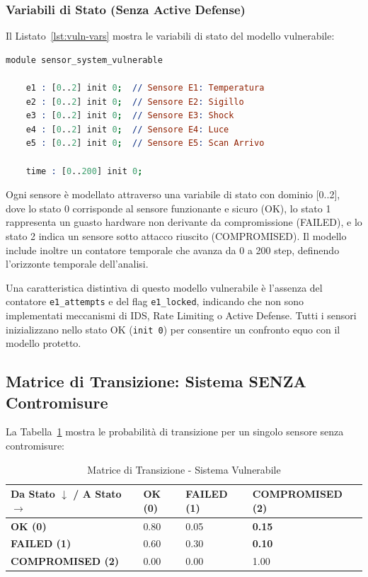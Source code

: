 \subsubsection{Variabili di Stato (Senza Active Defense)}
Il Listato~\ref{lst:vuln-vars} mostra le variabili di stato del modello vulnerabile:
\begin{lstlisting}[style=mystyle, language=Prolog, caption={Variabili di stato del modello vulnerabile}, label=lst:vuln-vars]
module sensor_system_vulnerable
    
    e1 : [0..2] init 0;  // Sensore E1: Temperatura
    e2 : [0..2] init 0;  // Sensore E2: Sigillo
    e3 : [0..2] init 0;  // Sensore E3: Shock
    e4 : [0..2] init 0;  // Sensore E4: Luce
    e5 : [0..2] init 0;  // Sensore E5: Scan Arrivo
    
    time : [0..200] init 0;
\end{lstlisting}

Ogni sensore è modellato attraverso una variabile di stato con dominio [0..2], dove lo stato 0 corrisponde al sensore funzionante e sicuro (OK), lo stato 1 rappresenta un guasto hardware non derivante da compromissione (FAILED), e lo stato 2 indica un sensore sotto attacco riuscito (COMPROMISED). Il modello include inoltre un contatore temporale che avanza da 0 a 200 step, definendo l'orizzonte temporale dell'analisi.

Una caratteristica distintiva di questo modello vulnerabile è l'assenza del contatore \texttt{e1\_attempts} e del flag \texttt{e1\_locked}, indicando che non sono implementati meccanismi di IDS, Rate Limiting o Active Defense. Tutti i sensori inizializzano nello stato OK (\texttt{init 0}) per consentire un confronto equo con il modello protetto.

\subsection{Matrice di Transizione: Sistema SENZA Contromisure}
La Tabella~\ref{tab:matrice-vulnerabile} mostra le probabilità di transizione per un singolo sensore senza contromisure:

\begin{table}[H]
\centering
\label{tab:matrice-vulnerabile}
\begin{tabularx}{\textwidth}{|l|X|X|X|}
\hline
\textbf{Da Stato $\downarrow$ / A Stato $\rightarrow$} & \textbf{OK (0)} & \textbf{FAILED (1)} & \textbf{COMPROMISED (2)} \\ \hline
\textbf{OK (0)} & 0.80 & 0.05 & \textbf{0.15} \\ \hline
\textbf{FAILED (1)} & 0.60 & 0.30 & \textbf{0.10} \\ \hline
\textbf{COMPROMISED (2)} & 0.00 & 0.00 & 1.00 \\ \hline
\end{tabularx}
\caption{Matrice di Transizione - Sistema Vulnerabile}
\end{table}

